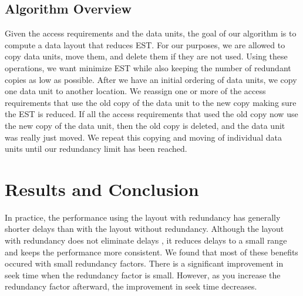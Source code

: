\subsection{Algorithm Overview}

Given the access requirements and the data units, the goal of our algorithm is to compute a data layout that reduces EST.  For our purposes, we are allowed to copy data units, move them, and
delete them if they are not used. Using these operations, we want minimize EST
while also keeping the number of redundant copies as low as possible. 
After we have an initial ordering of data units, we copy one data unit
to another location. We reassign one or more of the access requirements that
use the old copy of the data unit to the new copy making sure the EST is
reduced.  If all the access requirements that used the old copy now use the
new copy of the data unit, then the old copy is deleted, and the data unit was really just moved.  We repeat this
copying and moving of individual data units until our redundancy
limit has been reached. 

\section{Results and Conclusion}

In practice, the performance using the layout with redundancy has generally shorter delays than with the layout without redundancy. Although the layout with redundancy does not eliminate delays , it reduces delays to a small range and keeps the performance more consistent. We found that most of these benefits occured with small redundancy factors. There is a significant improvement in seek time when the redundancy factor is small. However, as you increase the redundancy factor afterward, the improvement in seek time decreases.


